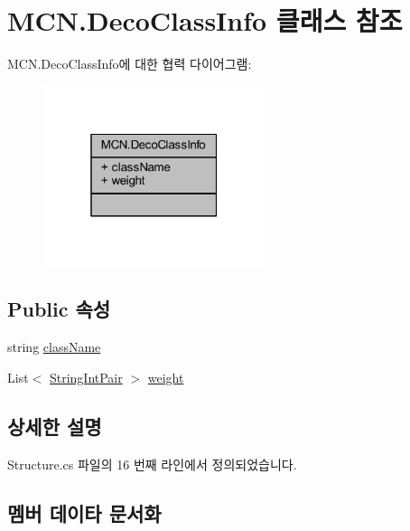 \hypertarget{class_m_c_n_1_1_deco_class_info}{}\section{M\+C\+N.\+Deco\+Class\+Info 클래스 참조}
\label{class_m_c_n_1_1_deco_class_info}


M\+C\+N.\+Deco\+Class\+Info에 대한 협력 다이어그램\+:
\nopagebreak
\begin{figure}[H]
\begin{center}
\leavevmode
\includegraphics[width=184pt]{class_m_c_n_1_1_deco_class_info__coll__graph}
\end{center}
\end{figure}
\subsection*{Public 속성}
\begin{DoxyCompactItemize}
\item 
string \hyperlink{class_m_c_n_1_1_deco_class_info_a3b0fc8a06269e57ded3835ea02026859}{class\+Name}
\item 
List$<$ \hyperlink{class_m_c_n_1_1_string_int_pair}{String\+Int\+Pair} $>$ \hyperlink{class_m_c_n_1_1_deco_class_info_a04ed1d8d36502303fa7a2a1f872f1681}{weight}
\end{DoxyCompactItemize}


\subsection{상세한 설명}


Structure.\+cs 파일의 16 번째 라인에서 정의되었습니다.



\subsection{멤버 데이타 문서화}
